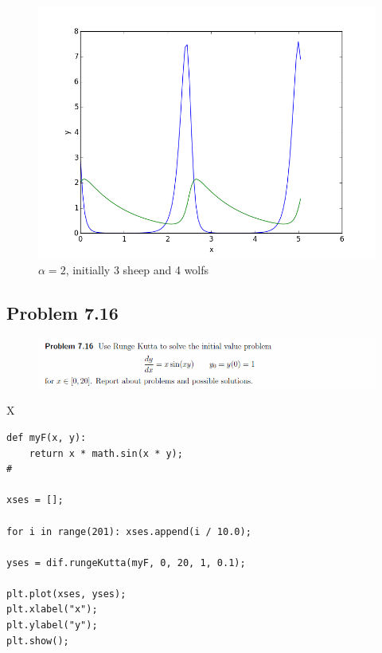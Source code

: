 \begin{figure}[!ht]
\includegraphics[width=1\textwidth]{chapters/images/figure-7-15-3}
\caption{$\alpha = 2$, initially 3 sheep and 4 wolfs}
\end{figure}







\subsection{Problem 7.16}


\begin{figure}[!ht]
\includegraphics[width=1\textwidth]{chapters/images/desc-7-16}
\end{figure}



X

\begin{lstlisting}[caption=todo]
def myF(x, y):
	return x * math.sin(x * y);
#

xses = [];

for i in range(201): xses.append(i / 10.0);

yses = dif.rungeKutta(myF, 0, 20, 1, 0.1);

plt.plot(xses, yses);
plt.xlabel("x");
plt.ylabel("y");
plt.show();
\end{lstlisting}


